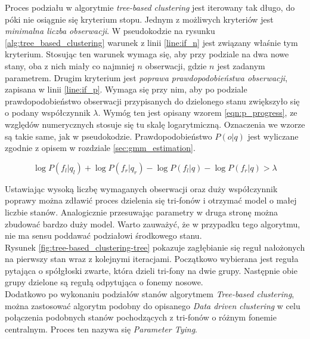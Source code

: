 \documentclass[shortabstract, mgr]{iithesis}
\begin{document}
	Proces podziału w algorytmie \textit{tree-based clustering} jest iterowany tak długo, do póki nie osiągnie się kryterium stopu. Jednym z możliwych kryteriów jest \textit{minimalna liczba obserwacji}. W pseudokodzie na rysunku \ref{alg:tree_based_clustering} warunek z linii \ref{line:if_n} jest związany właśnie tym kryterium. Stosując ten warunek wymaga się, aby przy podziale na dwa nowe stany, oba z nich miały co najmniej $n$ obserwacji, gdzie $n$ jest zadanym parametrem. Drugim kryterium jest \textit{poprawa prawdopodobieństwa obserwacji}, zapisana w linii \ref{line:if_p}. Wymaga się przy nim, aby po podziale prawdopodobieństwo obserwacji przypisanych do dzielonego stanu zwiększyło się o podany współczynnik $\lambda$. Wymóg ten jest opisany wzorem \ref{eqn:p_progress}, ze względów numerycznych stosuje się tu skalę logarytmiczną. Oznaczenia we wzorze są takie same, jak w pseudokodzie. Prawdopodobieństwo $P(o|q)$ jest wyliczane zgodnie z opisem w rozdziale \ref{sec:gmm_estimation}.
	 
	 \begin{equation}
	 	\log{P(f_l | q_l)} + \log{P(f_r | q_r)} - \log{P(f_l | q)} - \log{P(f_r | q)} > \lambda
	 	\label{eqn:p_progress}
	 \end{equation}
	 
	Ustawiając wysoką liczbę wymaganych obserwacji oraz duży współczynnik poprawy można zdławić proces dzielenia się tri-fonów i otrzymać model o małej liczbie stanów. Analogicznie przesuwając parametry w druga stronę można zbudować bardzo duży model. Warto zauważyć, że w przypadku tego algorytmu, nie ma sensu poddawać podziałowi środkowego stanu.  \\
	Rysunek \ref{fig:tree-based_clustering-tree} pokazuje zagłębianie się reguł nałożonych na pierwszy stan wraz z kolejnymi iteracjami. Początkowo wybierana jest reguła pytająca o spółgłoski zwarte, która dzieli tri-fony na dwie grupy. Następnie obie grupy dzielone są regułą odpytująca o fonemy nosowe. \\
	Dodatkowo po wykonaniu podziałów stanów algorytmem \textit{Tree-based clustering}, można zastosować algorytm podobny do opisanego \textit{Data driven clustering} w celu połączenia podobnych stanów pochodzących z tri-fonów o różnym fonemie centralnym. Proces ten nazywa się \textit{Parameter Tying}.
	
\end{document}
